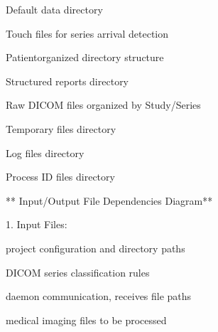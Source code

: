 \documentclass[letterpaper,10pt,english]{sphinxmanual}
\begin{document}
\sphinxAtStartPar
{}

\begin{DUlineblock}{0em}
\item[] \sphinxhyphen{}  \sphinxhyphen{} Default data directory
\item[] \sphinxhyphen{}  \sphinxhyphen{} Touch files for series arrival detection
\item[] \sphinxhyphen{}  \sphinxhyphen{} Patient\sphinxhyphen{}organized directory structure
\item[] \sphinxhyphen{}  \sphinxhyphen{} Structured reports directory
\item[] \sphinxhyphen{}  \sphinxhyphen{} Raw DICOM files organized by Study/Series
\item[] \sphinxhyphen{}  \sphinxhyphen{} Temporary files directory
\item[] \sphinxhyphen{}  \sphinxhyphen{} Log files directory
\item[] \sphinxhyphen{}  \sphinxhyphen{} Process ID files directory
\end{DUlineblock}

\sphinxAtStartPar
** Input/Output File Dependencies Diagram**


\sphinxAtStartPar
{}

\begin{DUlineblock}{0em}
\item[] 1. Input Files:
\end{DUlineblock}

\begin{DUlineblock}{0em}
\item[] \sphinxhyphen{}  \sphinxhyphen{} project configuration and directory paths
\item[] \sphinxhyphen{}  \sphinxhyphen{} DICOM series classification rules
\item[] \sphinxhyphen{}  \sphinxhyphen{} daemon communication, receives file paths
\item[] \sphinxhyphen{}  \sphinxhyphen{} medical imaging files to be processed
\end{DUlineblock}
\end{document}
